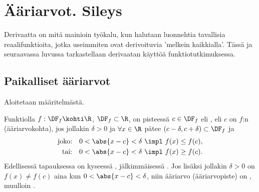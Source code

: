 \section{Ääriarvot. Sileys} \label{ääriarvot}
\alku

Derivaatta on mitä mainioin työkalu, kun halutaan luonnehtia tavallisia reaalifunktioita,
jotka useimmiten ovat derivoituvia 'melkein kaikkialla'. Tässä ja seuraavassa luvussa
tarkastellaan derivaatan käyttöä funktiotutkimuksessa.

\subsection*{Paikalliset ääriarvot}

Aloitetaan määritelmästä.
\begin{Def} \label{paikallinen ääriarvo}
Funktiolla $f:\DF_f\kohti\R$, $\DF_f\subset\R$, on pisteessä $c\in\DF_f$  eli
, eli $c$ on $f$:n  
(ääri\-arvokohta), jos jollakin $\delta>0$ ja $\forall x\in\R$ pätee
$(c-\delta,c+\delta)\subset\DF_f$ ja
\begin{align*}
\text{joko:}\quad 0<\abs{x-c}<\delta \ &\impl \ f(x) \le f(c), \\
 \text{tai:}\quad 0<\abs{x-c}<\delta \ &\impl \ f(x) \ge f(c).
\end{align*}
Edellisessä tapauksessa on kyseessä , jälkimmäisessä 
. Jos lisäksi jollakin $\delta>0$ on $f(x) \neq f(c)$ aina
kun $0<\abs{x-c}<\delta$, niin ääriarvo (ääriarvopiste) on , muulloin
.
\end{Def}

